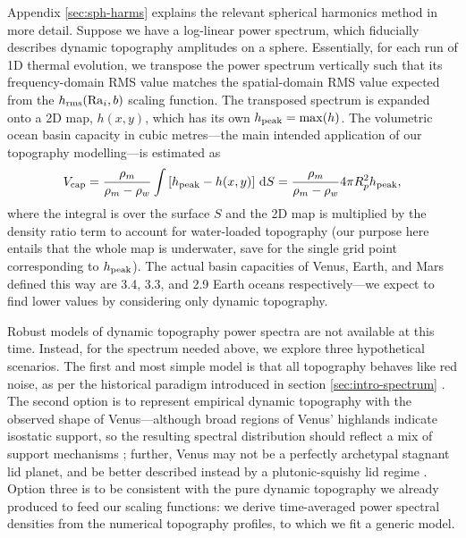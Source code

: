 \documentclass[trackchanges]{aastex63}
\begin{document}
Appendix \ref{sec:sph-harms} explains the relevant spherical harmonics method in more detail. Suppose we have a log-linear power spectrum, which fiducially describes dynamic topography amplitudes on a sphere. Essentially, for each run of 1D thermal evolution, we transpose the power spectrum vertically such that its frequency-domain RMS value matches the spatial-domain RMS value expected from the $h_{\rm rms}({\rm Ra}_i, b)$ scaling function. The transposed spectrum is expanded onto a 2D map, $h(x, y)$, which has its own $h_{\rm peak} = {\rm max}(h)$. The volumetric ocean basin capacity in cubic metres---the main intended application of our topography modelling---is estimated as
\begin{equation}\label{eq:ocean-integral}
V_{\rm cap} = \frac{\rho_m}{\rho_m - \rho_w} \int \left[h_{\rm peak} - h(x, y)\right] \, {\rm d} S = \frac{\rho_m}{\rho_m - \rho_w} 4 \pi R_p^2 h_{\rm peak},
\end{equation}
where the integral is over the surface $S$ and the 2D map is multiplied by the density ratio term to account for water-loaded topography (our purpose here entails that the whole map is underwater, save for the single grid point corresponding to $h_{\rm peak}$). The actual basin capacities of Venus, Earth, and Mars defined this way are 3.4, 3.3, and 2.9 Earth oceans respectively---we expect to find lower values by considering only dynamic topography.

Robust models of dynamic topography power spectra are not available at this time. Instead, for the spectrum needed above, we explore three hypothetical scenarios. The first and most simple model is that all topography behaves like red noise, as per the historical paradigm introduced in section \ref{sec:intro-spectrum} \citep[e.g.,][]{turcotte_fractal_1987}. The second option is to represent empirical dynamic topography with the observed shape of Venus---although broad regions of Venus' highlands indicate isostatic support, so the resulting spectral distribution should reflect a mix of support mechanisms \citep[e.g.,][]{kiefer_dynamic_1986, arkanihamed_analysis_1996, simons_localization_1997, yang_separation_2016}; further, Venus may not be a perfectly archetypal stagnant lid planet, and be better described instead by a plutonic-squishy lid regime \citep{lourenco_plutonic-squishy_2020}. Option three is to be consistent with the pure dynamic topography we already produced to feed our scaling functions: we derive time-averaged power spectral densities from the numerical topography profiles, to which we fit a generic model. 
\end{document}
